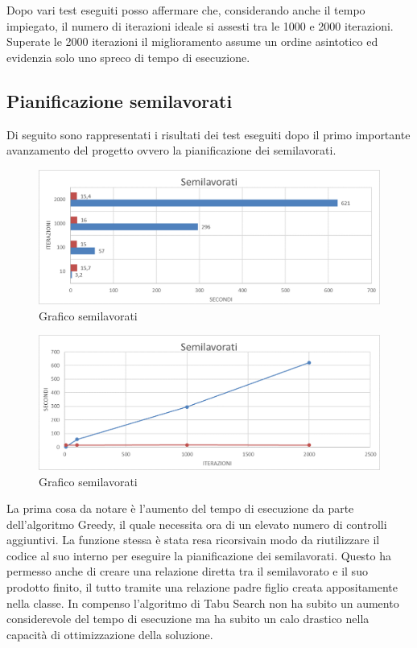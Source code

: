 Dopo vari test eseguiti posso affermare che, considerando anche il tempo impiegato, il numero di iterazioni ideale si assesti tra le 1000 e 2000 iterazioni.
Superate le 2000 iterazioni il miglioramento assume un ordine asintotico ed evidenzia solo uno spreco di tempo di esecuzione. 

\newpage
\subsection{Pianificazione semilavorati}

Di seguito sono rappresentati i risultati dei test eseguiti dopo il primo importante avanzamento del progetto ovvero la pianificazione dei semilavorati.
\begin{figure}[H]
	\includegraphics[width=13cm]{immagini/graficoSL.png}
	\centering
	\caption{Grafico semilavorati}
\end{figure}

\begin{figure}[H]
	\includegraphics[width=13cm]{immagini/graficosl2.png}
	\centering
	\caption{Grafico semilavorati}
\end{figure}

La prima cosa da notare è l'aumento del tempo di esecuzione da parte dell'algoritmo Greedy, il quale necessita ora di un elevato numero di controlli aggiuntivi. La funzione
stessa è stata resa ricorsiva\glosp in modo da riutilizzare il codice al suo interno per eseguire la pianificazione dei semilavorati. Questo ha permesso anche di creare una
relazione diretta tra il semilavorato e il suo prodotto finito, il tutto tramite una relazione padre figlio creata appositamente nella classe.
In compenso l'algoritmo di Tabu Search non ha subito un aumento considerevole del tempo di esecuzione ma ha subito un calo drastico nella capacità di ottimizzazione della
soluzione.

